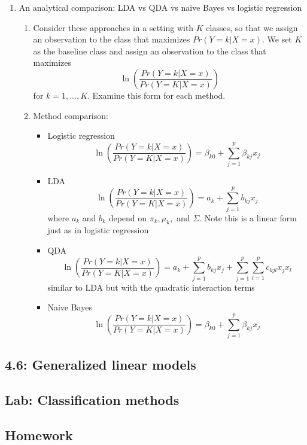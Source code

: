 \documentclass{article}
\begin{document}
\begin{enumerate}
\item An analytical comparison: LDA vs QDA vs naive Bayes vs logistic regression
\begin{enumerate}
\item Consider these approaches in a setting with $K$ classes, so that we assign an observation to the class that maximizes $Pr(Y=k | X=x)$. We set $K$ as the baseline class and assign an observation to the class that maximizes
\[
\ln \left( \frac{Pr(Y=k | X=x)}{Pr(Y=K | X=x)} \right)
\]
for $k = 1, \dots, K$. Examine this form for each method.
\item Method comparison:
\begin{itemize}
\item Logistic regression
\[
\ln \left( \frac{Pr(Y=k | X=x)}{Pr(Y=K | X=x)} \right) = \beta_{k0} + \sum_{j=1}^p \beta_{kj} x_j
\]
\item LDA
\[
\ln \left( \frac{Pr(Y=k | X=x)}{Pr(Y=K | X=x)} \right) = a_k + \sum_{j=1}^p b_{kj}x_j
\]
where $a_k$ and $b_k$ depend on $\pi_k, \mu_k, $ and $\Sigma$. Note this is a linear form just as in logistic regression
\item QDA
\[
\ln \left( \frac{Pr(Y=k | X=x)}{Pr(Y=K | X=x)} \right) =  a_k + \sum_{j=1}^p b_{kj}x_j + \sum_{j=1}^p\sum_{l=1}^p c_{kjl}x_jx_l 
\]
similar to LDA but with the quadratic interaction terms
\item Naive Bayes
\[
\ln \left( \frac{Pr(Y=k | X=x)}{Pr(Y=K | X=x)} \right) = \beta_{k0} + \sum_{j=1}^p \beta_{kj} x_j
\]
\end{itemize}
\end{enumerate}

\end{enumerate}

\subsection*{4.6: Generalized linear models}

\subsection*{Lab: Classification methods}

\subsection*{Homework}
\end{document}
